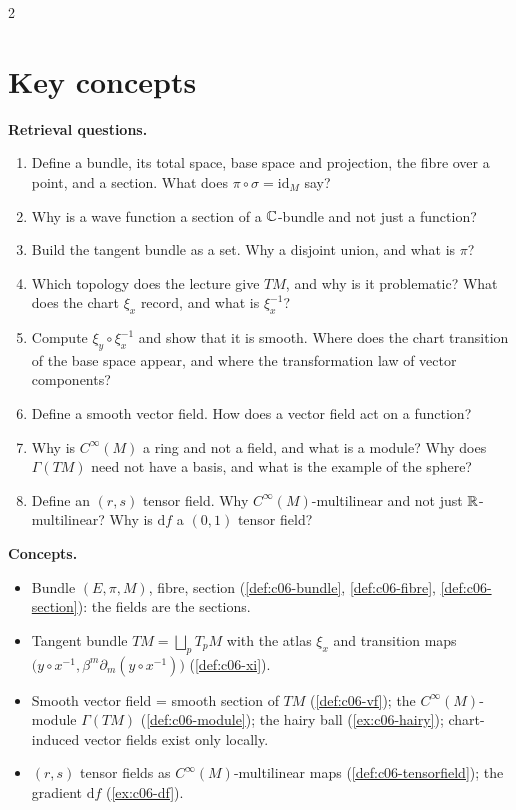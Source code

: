 \begin{paracol}{2}
\section*{Key concepts}
\begin{keyconcepts}
\textbf{Retrieval questions.}
\begin{enumerate}
  \item Define a bundle, its total space, base space and projection, the fibre over a point, and a section. What does $\pi\circ\sigma=\mathrm{id}_M$ say?
  \item Why is a wave function a section of a $\mathbb{C}$-bundle and not just a function?
  \item Build the tangent bundle as a set. Why a disjoint union, and what is $\pi$?
  \item Which topology does the lecture give $TM$, and why is it problematic? What does the chart $\xi_x$ record, and what is $\xi_x^{-1}$?
  \item Compute $\xi_y\circ\xi_x^{-1}$ and show that it is smooth. Where does the chart transition of the base space appear, and where the transformation law of vector components?
  \item Define a smooth vector field. How does a vector field act on a function?
  \item Why is $C^\infty(M)$ a ring and not a field, and what is a module? Why does $\Gamma(TM)$ need not have a basis, and what is the example of the sphere?
  \item Define an $(r,s)$ tensor field. Why $C^\infty(M)$-multilinear and not just $\mathbb{R}$-multilinear? Why is $\mathrm df$ a $(0,1)$ tensor field?
\end{enumerate}
\textbf{Concepts.}
\begin{itemize}
  \item Bundle $(E,\pi,M)$, fibre, section (\cref{def:c06-bundle}, \cref{def:c06-fibre}, \cref{def:c06-section}): the fields are the sections.
  \item Tangent bundle $TM=\bigsqcup_pT_pM$ with the atlas $\xi_x$ and transition maps $\bigl(y\circ x^{-1},\beta^m\partial_m(y\circ x^{-1})\bigr)$ (\cref{def:c06-xi}).
  \item Smooth vector field = smooth section of $TM$ (\cref{def:c06-vf}); the $C^\infty(M)$-module $\Gamma(TM)$ (\cref{def:c06-module}); the hairy ball (\cref{ex:c06-hairy}); chart-induced vector fields exist only locally.
  \item $(r,s)$ tensor fields as $C^\infty(M)$-multilinear maps (\cref{def:c06-tensorfield}); the gradient $\mathrm df$ (\cref{ex:c06-df}).
\end{itemize}
\end{keyconcepts}

\flushside
\end{paracol}
